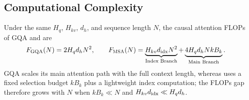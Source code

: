 \subsection{Computational Complexity}
\label{sec:msa-flops}

Under the same $H_q$, $H_{kv}$, $d_h$, and sequence length $N$, the causal attention FLOPs of GQA and \method{} are
\begin{equation}
F_{\rm GQA}(N)= 2 H_q d_h N^2,
\qquad
F_{\textsc{MSA}{}}(N)= \underbrace{H_{kv} d_{\rm idx} N^2}_{\text{Index Branch}}
 + \underbrace{4 H_q d_h Nk B_k}_{\text{Main Branch}} .
\end{equation}
GQA scales its main attention path with the full context length, whereas \method{} uses a fixed selection budget $kB_k$ plus a lightweight index computation; the FLOPs gap therefore grows with $N$ when $kB_k \ll N$ and $H_{kv}d_{\rm idx} \ll H_qd_h$.
